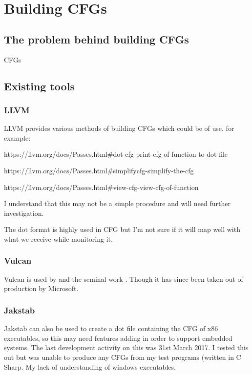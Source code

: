 \section{Building CFGs}

\subsection{The problem behind building CFGs}

CFGs 

\subsection{Existing tools}

\subsubsection{LLVM}

LLVM provides various methods of building CFGs which could be of use, for example:

https://llvm.org/docs/Passes.html#dot-cfg-print-cfg-of-function-to-dot-file

https://llvm.org/docs/Passes.html#simplifycfg-simplify-the-cfg

https://llvm.org/docs/Passes.html#view-cfg-view-cfg-of-function

I understand that this may not be a simple procedure and will need further investigation.

The dot format is highly used in CFG but I'm not sure if it will map well with what we receive while monitoring it.

\subsubsection{Vulcan}

Vulcan \cite{Edwards2001} is used by \cite{Davi2012} and the seminal work \cite{Abadi2005}. Though it has since been taken out of production by Microsoft.

\subsubsection{Jakstab}

Jakstab \cite{Kinder2008} can also be used to create a dot file containing the CFG of x86 executables, so this may need features adding in order to support embedded systems. The last development activity on this was 31st March 2017. I tested this out but was unable to produce any CFGs from my test programs (written in C Sharp. My lack of understanding of windows executables. 

